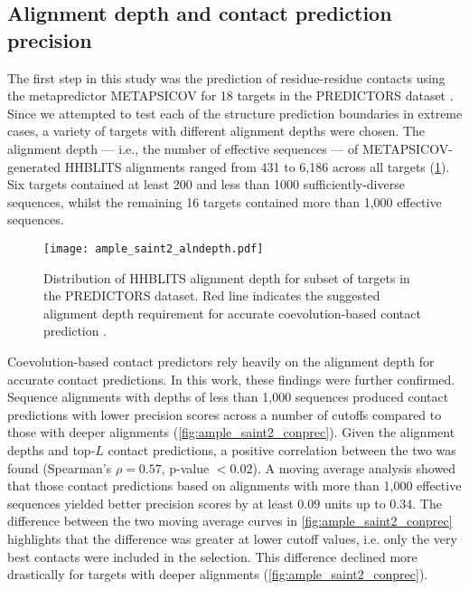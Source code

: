 \subsection{Alignment depth and contact prediction precision}
The first step in this study was the prediction of residue-residue contacts using the metapredictor METAPSICOV for 18 targets in the PREDICTORS dataset \cite{Jones2015-vq}. Since we attempted to test each of the structure prediction boundaries in extreme cases, a variety of targets with different alignment depths were chosen. The alignment depth --- i.e., the number of effective sequences --- of METAPSICOV-generated HHBLITS alignments ranged from 431 to 6,186 across all targets (\cref{fig:ample_saint2_alndepth}). Six targets contained at least 200 and less than 1000 sufficiently-diverse sequences, whilst the remaining 16 targets contained more than 1,000 effective sequences.

\begin{figure}[H]
    \centering
    \texttt{[image: ample\_saint2\_alndepth.pdf]}
    \caption[Alignment depth for subsets of targets in the PREDICTORS dataset]{Distribution of HHBLITS alignment depth for subset of targets in the PREDICTORS dataset. Red line indicates the suggested alignment depth requirement for accurate coevolution-based contact prediction \cite{Simkovic2017-xs}.}
    \label{fig:ample_saint2_alndepth}
\end{figure}

Coevolution-based contact predictors rely heavily on the alignment depth for accurate contact predictions. In this work, these findings were further confirmed. Sequence alignments with depths of less than 1,000 sequences produced contact predictions with lower precision scores across a number of cutoffs compared to those with deeper alignments (\cref{fig:ample_saint2_conprec}). Given the alignment depths and top-$L$ contact predictions, a positive correlation between the two was found (Spearman's $\rho=0.57$, p-value $<0.02$). A moving average analysis showed that those contact predictions based on alignments with more than 1,000 effective sequences yielded better precision scores by at least 0.09 units up to 0.34. The difference between the two moving average curves in \cref{fig:ample_saint2_conprec} highlights that the difference was greater at lower cutoff values, i.e. only the very best contacts were included in the selection. This difference declined more drastically for targets with deeper alignments (\cref{fig:ample_saint2_conprec}).

